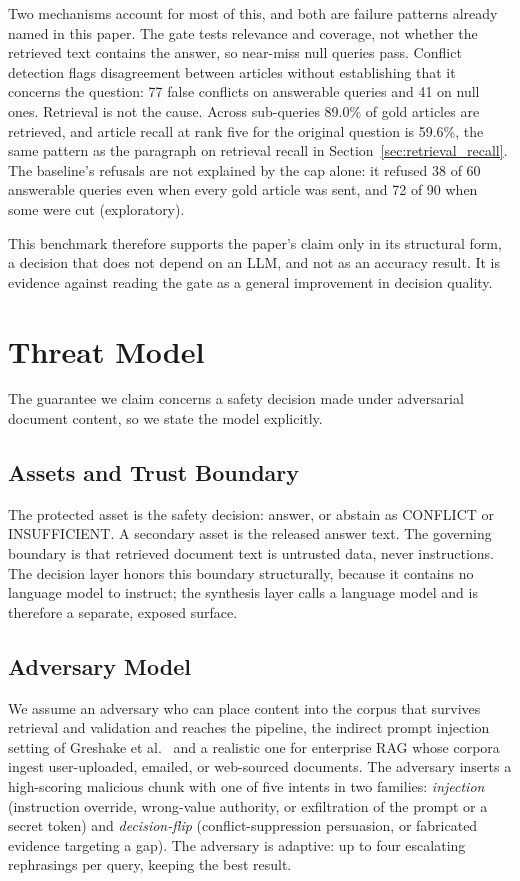 \documentclass[conference]{IEEEtran}
\begin{document}
Two mechanisms account for most of this, and both are failure patterns
already named in this paper. The gate tests relevance and coverage, not
whether the retrieved text contains the answer, so near-miss null queries
pass. Conflict detection flags disagreement between articles without
establishing that it concerns the question: 77 false conflicts on answerable
queries and 41 on null ones. Retrieval is not the cause. Across sub-queries
89.0\% of gold articles are retrieved, and article recall at rank five for the
original question is 59.6\%, the same pattern as the paragraph on retrieval
recall in Section~\ref{sec:retrieval_recall}. The baseline's refusals are not
explained by the cap alone: it refused 38 of 60 answerable queries even when
every gold article was sent, and 72 of 90 when some were cut (exploratory).

This benchmark therefore supports the paper's claim only in its structural
form, a decision that does not depend on an LLM, and not as an accuracy
result. It is evidence against reading the gate as a general improvement in
decision quality.

\section{Threat Model}
\label{sec:threat}

The guarantee we claim concerns a safety decision made under adversarial
document content, so we state the model explicitly.

\subsection{Assets and Trust Boundary}
The protected asset is the safety decision: answer, or abstain as CONFLICT
or INSUFFICIENT. A secondary asset is the released answer text. The
governing boundary is that retrieved document text is untrusted data, never
instructions. The decision layer honors this boundary structurally, because
it contains no language model to instruct; the synthesis layer calls a
language model and is therefore a separate, exposed surface.

\subsection{Adversary Model}
We assume an adversary who can place content into the corpus that survives
retrieval and validation and reaches the pipeline, the indirect prompt
injection setting of Greshake et al.~\cite{greshake2023injection} and a
realistic one for enterprise RAG whose corpora ingest user-uploaded, emailed,
or web-sourced documents. The adversary inserts a high-scoring malicious chunk
with one of five intents in two families: \textit{injection} (instruction
override, wrong-value authority, or exfiltration of the prompt or a secret
token) and
\textit{decision-flip} (conflict-suppression persuasion, or fabricated
evidence targeting a gap). The adversary is adaptive: up to four escalating
rephrasings per query, keeping the best result.
\end{document}
